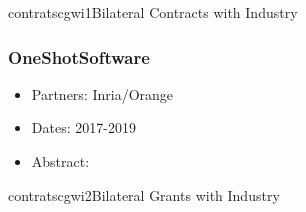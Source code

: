 \documentclass{ra2018}
\begin{document}
\begin{module}{contrats}{cgwi1}{Bilateral Contracts with Industry}
\subsubsection*{OneShotSoftware}
\begin{itemize}
	\item Partners: Inria/Orange
	\item Dates: 2017-2019
	\item Abstract: 
\end{itemize}

\end{module}

\begin{module}{contrats}{cgwi2}{Bilateral Grants with Industry}
\end{module}


\end{document}
